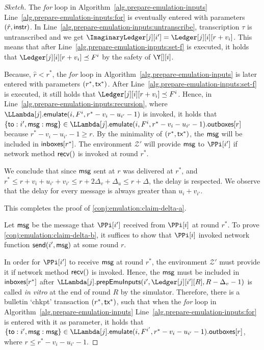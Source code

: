 \begin{proof}[Sketch]
  The \emph{for} loop in Algorithm~\ref{alg.prepare-emulation-inputs}
  Line~\ref{alg.prepare-emulation-inputs:for} is eventually entered with
  parameters $(\hat{r}, \textsf{instr})$.
  In Line~\ref{alg.prepare-emulation-inputs:untranscribe}, transcription $\tau$
  is untranscribed and we get $\ImaginaryLedger[j][i'] = \Ledger[j][i][r + v_i]$.
  This means that after Line~\ref{alg.prepare-emulation-inputs:set-f} is executed,
  it holds that $\Ledger[j][i][r + v_i] \preceq F^i$ by the safety of $\Y[][i]$.

  Because, $\hat{r} < r^*$, the \emph{for} loop in Algorithm~\ref{alg.prepare-emulation-inputs}
  is later entered with parameters $(r^*, \textsf{tx}^*)$.
  After Line~\ref{alg.prepare-emulation-inputs:set-f} is executed,
  it still holds that $\Ledger[j][i][r + v_i] \preceq F^i$.
  Hence, in Line~\ref{alg.prepare-emulation-inputs:recursion}, where
  $\LLambda[j].\emulate(i, F^i, r^* - v_i - u_{i'} - 1)$ is invoked, it holds that
  $\{\textsf{to}: i', \msg: \msg\} \in \LLambda[j].\emulate(i, F^i, r^* - v_i - u_{i'} - 1).\outboxes[r]$
  because $r^* - v_i - u_{i'} - 1 \geq r$.
  By the minimality of $(r^*, \textsf{tx}^*)$, the $\textsf{msg}$ will be included in $\textsf{inboxes}[r^*]$.
  The environment $\mathcal{Z}'$ will provide $\textsf{msg}$ to $\PPi[i']$
  if network method $\textsf{recv}()$ is invoked at round $r^*$.

  We conclude that since $\textsf{msg}$ sent at $r$ was delivered at $r^*$,
  and $r^* \leq r + v_{i} + u_{i'} + v_{i'} \leq r + 2 \Delta_v + \Delta_u \leq r + \Delta$, the
  delay is respected. We observe that the delay for every message is always
  greater than $u_i + v_{i'}$.

  This completes the proof of \ref{conj:emulation:claim-delta-a}.

  Let $\textsf{msg}$ be the message that $\PPi[i']$ received from $\PPi[i]$ at round $r^*$.
  To prove \ref{conj:emulation:claim-delta-b}, it suffices to show that
  $\PPi[i]$ invoked network function $\textsf{send}(i', \textsf{msg})$ at some round $r$.

  In order for $\PPi[i']$ to receive $\textsf{msg}$ at round $r^*$,
  the environment $\mathcal{Z}'$ must provide it if network method $\textsf{recv}()$ is invoked.
  Hence, the $\textsf{msg}$ must be included in $\textsf{inboxes}[r^*]$ after $\LLambda[j].\prepareEmulationInputs(i', \Ledger[j][i'][R], R - \Delta_v - 1)$
  is called \emph{in vitro} at the end of round $R$ by the simulator.
  Therefore, there is a bulletin `chkpt' transaction $(r^*, \textsf{tx}^*)$, such that
  when the \emph{for} loop in Algorithm~\ref{alg.prepare-emulation-inputs} Line~\ref{alg.prepare-emulation-inputs:for}
  is entered with it as parameter, it holds that
  $\{\textsf{to}: i', \msg: \msg\} \in \LLambda[j].\emulate(i, F^{i'}, r^* - v_i - u_{i'} - 1).\outboxes[r]$,
  where $r \leq r^* - v_i - u_{i'} - 1$.


\end{proof}
